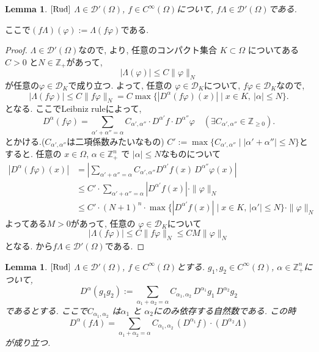 \documentclass[dvipdfmx,a4paper,11pt]{article} %
\newtheorem{lem}[thm]{Lemma}
\theoremstyle{definition}
\theoremstyle{remark}
\numberwithin{equation}{section}
\newcommand{\N}{\mathbb{Z}_+}
\begin{document}
\begin{tcolorbox}[mybox]
\begin{lem}{$\cite[6.15]{Rud}$}
\label{lem-H-8}
\(\Lambda \in \mathcal{D}'(\Omega)\), \(f \in C^\infty(\Omega)\)について, 
\(f \Lambda \in \mathcal{D}'(\Omega)\)である. 
\end{lem}
\end{tcolorbox}
ここで$(f \Lambda)(\varphi ):=\Lambda (f \varphi)$である. 
\begin{proof}
\(\Lambda \in \mathcal{D}'(\Omega)\)なので, 
\cite[Thm 6.8]{Rud}より,
任意のコンパクト集合 \(K \subset \Omega\)
についてある\(C >0\) と\(N \in \N\)があって, 
\[
|\Lambda(\varphi)| \le C \|\varphi\|_N
\]
が任意の\(\varphi \in \mathcal{D}_K\)で成り立つ. 
よって, 任意の \(\varphi \in \mathcal{D}_K\)について, 
$f \varphi \in \mathcal{D}_K$なので, 
\[
|\Lambda(f\varphi)| \le C \|f\varphi\|_N
= C \max \{ |D^\alpha(f\varphi)(x)| \mid x \in K, \ |\alpha| \le N \}.
\]
となる. ここでLeibniz ruleによって, 
\[
D^\alpha(f\varphi) = \sum_{\alpha' + \alpha'' = \alpha} C_{\alpha',\alpha''} \cdot D^{\alpha'} f \cdot D^{\alpha''} \varphi
\quad (\exists C_{\alpha',\alpha''} \in \mathbb{Z}_{\ge 0}).
\]
とかける.($C_{\alpha',\alpha''}$は二項係数みたいなもの) 
\(C' := \max \{ C_{\alpha',\alpha''} \mid |\alpha' + \alpha''| \le N \}\)とすると. 
任意の \(x \in \Omega\),  \(\alpha \in \N^n\) で \(|\alpha| \le N\)なものについて
\begin{align*}
|D^{\alpha}(f\varphi)(x)|
&= \left| \sum_{\alpha' + \alpha'' = \alpha} 
   C_{\alpha',\alpha''} D^{\alpha'} f(x)\, D^{\alpha''}\varphi(x) \right| \\[6pt]
&\leq C' \cdot \sum_{\alpha' + \alpha'' = \alpha} 
   |D^{\alpha'} f(x)| \cdot \|\varphi\|_{N} \\[6pt]
&\leq C' \cdot (N+1)^n \cdot 
   \max \{ |D^{\alpha'} f(x)| \mid x \in K,\, |\alpha'|\leq N \} \cdot \|\varphi\|_{N}
\end{align*}
よってある$M>0$があって, 任意の \(\varphi \in \mathcal{D}_K\)について 
$$|\Lambda(f\varphi)| \le C \|f\varphi\|_N \le CM \|\varphi\|_N$$
となる. \cite[Thm 6.8]{Rud}から\(f\Lambda \in \mathcal{D}'(\Omega)\)である. 
\end{proof}

\begin{tcolorbox}[mybox]
\begin{lem}{$\cite[6.15]{Rud}$}
\label{lem-H-9}
\(\Lambda \in \mathcal{D}'(\Omega)\), \(f \in C^\infty(\Omega)\)とする. 
 \(g_1, g_2 \in C^\infty(\Omega)\), \(\alpha \in \N^n\)について, 
\[
D^\alpha(g_1 g_2) 
:= \sum_{\alpha_1 + \alpha_2 = \alpha} C_{\alpha_1,\alpha_2} \, D^{\alpha_1} g_1 \, D^{\alpha_2} g_2
\]
であるとする. ここで\(C_{\alpha_1,\alpha_2}\) は\(\alpha_1\) と \(\alpha_2\)にのみ依存する自然数である. 
この時
\[
D^\alpha(f\Lambda) = \sum_{\alpha_1 + \alpha_2 = \alpha} C_{\alpha_1,\alpha_2} \, (D^{\alpha_1} f) \cdot (D^{\alpha_2} \Lambda)
\]
が成り立つ. 
\end{lem}
\end{tcolorbox}
\end{document}
